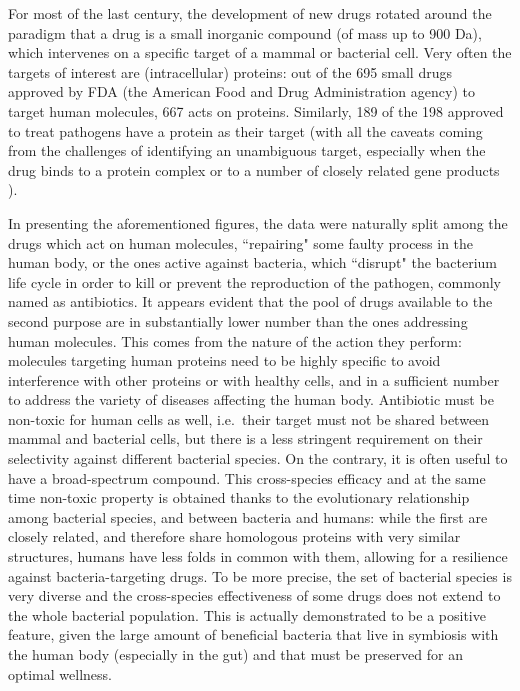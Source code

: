 For most of the last century, the development of new drugs rotated around the paradigm that a drug is a small inorganic compound (of mass up to 900 Da), which intervenes on a specific target of a mammal or bacterial cell. Very often the targets of interest are (intracellular) proteins: out of the 695 small drugs approved by FDA (the American Food and Drug Administration agency) to target human molecules, 667 acts on proteins. Similarly, 189 of the 198 approved to treat pathogens have a protein as their target
%
(with all the caveats coming from the challenges of identifying an unambiguous target, especially when the drug binds to a protein complex or to a number of closely related gene products \cite{Santos2017}).

In presenting the aforementioned figures, the data were naturally split among the drugs which act on human molecules, ``repairing" some faulty process in the human body, or the ones active against bacteria, which ``disrupt" the bacterium life cycle in order to kill or prevent the reproduction of the pathogen, commonly named as antibiotics.
%
It appears evident that the pool of drugs available to the second purpose are in substantially lower number than the ones addressing human molecules. This comes from the nature of the action they perform: molecules targeting human proteins need to be highly specific to avoid interference with other proteins or with healthy cells, and in a sufficient number to address the variety of diseases affecting the human body.
%
Antibiotic must be non-toxic for human cells as well, i.e.\ their target must not be shared between mammal and bacterial cells, but there is a less stringent requirement on their selectivity against different bacterial species. On the contrary, it is often useful to have a broad-spectrum compound. This cross-species efficacy and at the same time non-toxic property is obtained thanks to the evolutionary relationship among bacterial species, and between bacteria and humans: while the first are closely related, and therefore share homologous proteins with very similar structures, humans have less folds in common with them, allowing for a resilience against bacteria-targeting drugs.
%
To be more precise, the set of bacterial species is very diverse and the cross-species effectiveness of some drugs does not extend to the whole bacterial population. This is actually demonstrated to be a positive feature, given the large amount of beneficial bacteria that live in symbiosis with the human body (especially in the gut) and that must be preserved for an optimal wellness.

